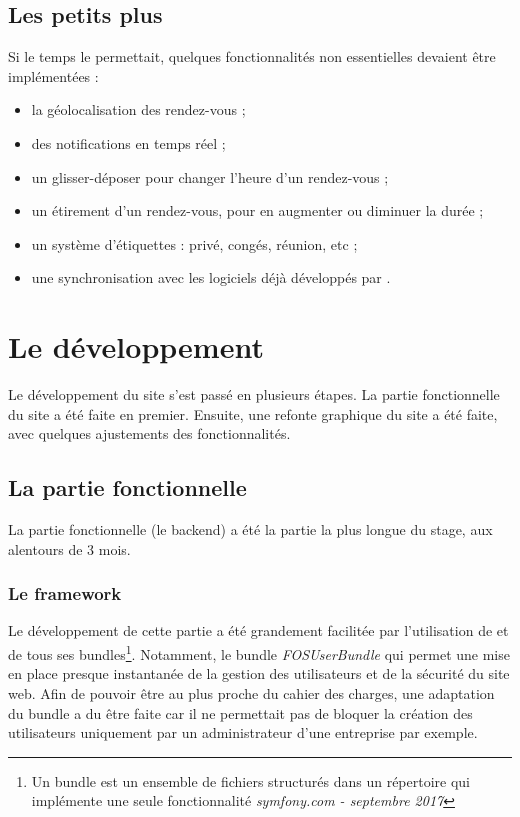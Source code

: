 \documentclass[a4paper, 11pt]{report}
\begin{document}
    \subsection{Les petits plus}
    Si le temps le permettait, quelques fonctionnalités non essentielles devaient être implémentées :
    \begin{itemize}
        \item la géolocalisation des rendez-vous ;
        \item des notifications en temps réel ;
        \item un glisser-déposer pour changer l'heure d'un rendez-vous ;
        \item un étirement d'un rendez-vous, pour en augmenter ou diminuer la durée ;
        \item un système d'étiquettes : privé, congés, réunion, etc ;
        \item une synchronisation avec les logiciels déjà développés par \lgk.
    \end{itemize}

\section{Le développement}
Le développement du site \agenda s'est passé en plusieurs étapes. La partie fonctionnelle du site a été faite en premier. Ensuite, une refonte graphique du site a été faite, avec quelques ajustements des fonctionnalités.
    \subsection{La partie fonctionnelle}
    La partie fonctionnelle (le backend) a été la partie la plus longue du stage, aux alentours de 3 mois.

    \subsubsection*{Le framework}
        Le développement de cette partie a été grandement facilitée par l'utilisation de \symfony et de tous ses bundles\footnote{Un bundle est un ensemble de fichiers structurés dans un répertoire qui implémente une seule fonctionnalité \textit{symfony.com - septembre 2017}}. Notamment, le bundle \textit{FOSUserBundle} qui permet une mise en place presque instantanée de la gestion des utilisateurs et de la sécurité du site web. Afin de pouvoir être au plus proche du cahier des charges, une adaptation du bundle a du être faite car il ne permettait pas de bloquer la création des utilisateurs uniquement par un administrateur d'une entreprise par exemple.
\end{document}
